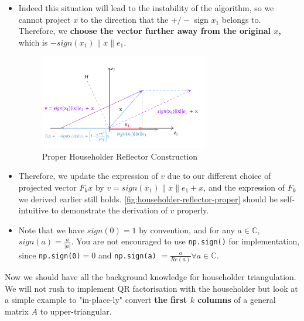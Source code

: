 \begin{itemize}
  \item Indeed this situation will lead to the instability of the algorithm, so we cannot project \(x\) to the direction that the $+/-$ sign  $x_1$ belongs to. Therefore, we \textbf{choose the vector further away from the original \(x\),} which is \(-sign(x_1)\|x\|e_1\).
  \begin{figure}[H]
    \centering
    \includegraphics[width=0.7\textwidth]{./imgs/householder-reflector-proper.png}
    \caption{Proper Householder Reflector Construction}
    \label{fig:householder-reflector-proper}
  \end{figure}
  \item Therefore, we update the expression of $v$ due to our different choice of projected vector $F_kx$ by  $v = sign(x_1)\|x\|e_1 + x$, and the expression of \(F_k\) we derived earlier still holds. \autoref{fig:householder-reflector-proper} should be self-intuitive to demonstrate the derivation of $v$ properly.
  \item Note that we have \(sign(0) = 1\)  by convention, and for any \(a \in \mathbb{C}\), \(sign(a) = \frac{a}{|a|}\). You are not encouraged to use \texttt{np.sign()} for implementation, since \texttt{np.sign(0)}\(=0\) and \texttt{np.sign(a)} \(=\frac{a}{Re(a)} \forall a \in \mathbb{C}\).     
\end{itemize}
Now we should have all the background knowledge for householder triangulation. We will not rush to implement QR factorisation with the householder but look at a simple example to "in-place-ly" convert \textbf{the first \(k\)  columns} of a general matrix \(A\) to upper-triangular.

